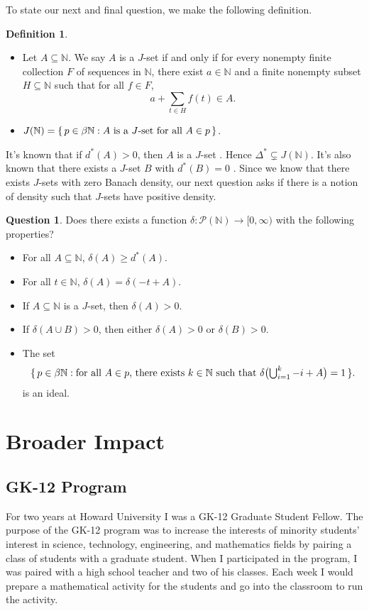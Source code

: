 \documentclass[12pt]{article}
\theoremstyle{plain}
\theoremstyle{definition}
\newtheorem{defn}[thm]{Definition}
\newtheorem{ques}[thm]{Question}
\newcommand{\bbN}{\mathbb{N}}
\begin{document}
To state our next and final question, we make the following definition. 
\begin{defn}
  \begin{itemize}
    \item[(a)] Let $A \subseteq \bbN$. 
      We say $A$ is a $J$-set if and only if for every nonempty finite
      collection $F$ of sequences in $\bbN$, there exist $a \in \bbN$
      and a finite nonempty subset $H \subseteq \bbN$ such that for
      all $f \in F$,
      \[
        a + \sum_{t \in H} f(t) \in A.
      \]
    \item[(b)] $J(\bbN) = \{\, p \in \beta\bbN : \hbox{$A$ is a
        $J$-set for all $A \in p$} \,\}$.
  \end{itemize}
\end{defn}

It's known that if $d^*(A) > 0$, then $A$ is a $J$-set \cite[Theorem
6.10]{Hindman:2009vn}.
Hence $\Delta^* \subsetneq J(\bbN)$.   
It's also known that there exists a $J$-set $B$
with $d^*(B) = 0$ \cite[Theorem 2.1]{Hindman:2009ys}.
Since we know that there exists $J$-sets with zero Banach density, our
next question asks if there is a notion of density such that $J$-sets
have positive density.
\begin{ques}
  Does there exists a function $\delta \colon \mathcal{P}(\bbN) \to
  [0, \infty)$ with the following properties? 
  \begin{itemize}
    \item[(1)] For all $A \subseteq \bbN$, $\delta(A) \ge d^*(A)$.
    \item[(2)] For all $t \in \bbN$, $\delta(A) = \delta(-t+A)$.
    \item[(3)] If $A \subseteq \bbN$ is a $J$-set, then $\delta(A) >
      0$.
    \item[(4)] If $\delta(A \cup B) > 0$, then either $\delta(A) >0$
      or $\delta(B) > 0$.
    \item[(5)] The set
      \[
        \{\, p \in \beta\bbN: \hbox{for all $A \in p$, there
          exists $k \in \bbN$} 
        \hbox{ such that $\delta\bigl(\bigcup_{i=1}^k
          -i+A\bigr) = 1$} \,\}.
      \]
      is an ideal. 
  \end{itemize}
\end{ques}

\section{Broader Impact}
\subsection{GK-12 Program}
For two years at Howard University I was a GK-12 Graduate Student
Fellow. 
The purpose of the GK-12 program was to increase the interests of
minority students' interest in science, technology, engineering, and
mathematics fields by pairing a class of students with a graduate
student. 
When I participated in the program, I was paired with a high school
teacher and two of his classes. 
Each week I would prepare a mathematical activity for the students and
go into the classroom to run the activity.
\end{document}
